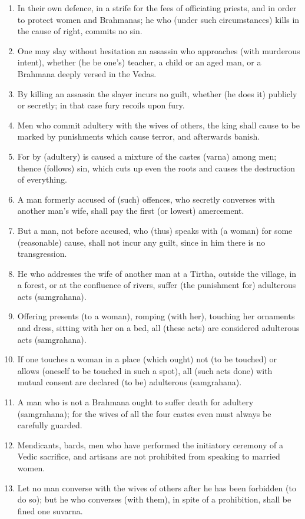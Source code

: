 \begin{enumerate}
\item In their own defence, in a strife for the fees of officiating priests, and in order to protect women and Brahmanas; he who (under such circumstances) kills in the cause of right, commits no sin.
\item One may slay without hesitation an assassin who approaches (with murderous intent), whether (he be one's) teacher, a child or an aged man, or a Brahmana deeply versed in the Vedas.
\item By killing an assassin the slayer incurs no guilt, whether (he does it) publicly or secretly; in that case fury recoils upon fury.
\item Men who commit adultery with the wives of others, the king shall cause to be marked by punishments which cause terror, and afterwards banish.
\item For by (adultery) is caused a mixture of the castes (varna) among men; thence (follows) sin, which cuts up even the roots and causes the destruction of everything.
\item A man formerly accused of (such) offences, who secretly converses with another man's wife, shall pay the first (or lowest) amercement.
\item But a man, not before accused, who (thus) speaks with (a woman) for some (reasonable) cause, shall not incur any guilt, since in him there is no transgression.
\item He who addresses the wife of another man at a Tirtha, outside the village, in a forest, or at the confluence of rivers, suffer (the punishment for) adulterous acts (samgrahana).
\item Offering presents (to a woman), romping (with her), touching her ornaments and dress, sitting with her on a bed, all (these acts) are considered adulterous acts (samgrahana).
\item If one touches a woman in a place (which ought) not (to be touched) or allows (oneself to be touched in such a spot), all (such acts done) with mutual consent are declared (to be) adulterous (samgrahana).
\item A man who is not a Brahmana ought to suffer death for adultery (samgrahana); for the wives of all the four castes even must always be carefully guarded.
\item Mendicants, bards, men who have performed the initiatory ceremony of a Vedic sacrifice, and artisans are not prohibited from speaking to married women.
\item Let no man converse with the wives of others after he has been forbidden (to do so); but he who converses (with them), in spite of a prohibition, shall be fined one suvarna.

\end{enumerate}
